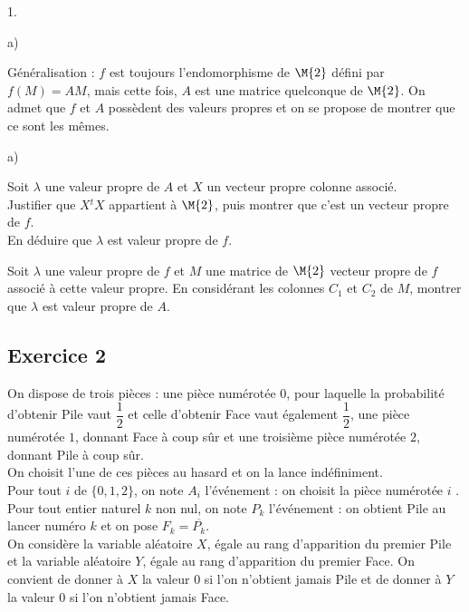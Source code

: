 \documentclass[11pt]{article}%
\begin{document}
\begin{noliste}{1.}
\begin{noliste}{a)}
    
  \end{noliste}




\item Généralisation : $f$ est toujours l'endomorphisme de $\M{2}$
  défini par $f(M) = AM$, mais cette fois, $A$ est une matrice
  quelconque de $\M{2}$. On admet que $f$ et $A$ possèdent des valeurs
  propres et on se propose de montrer que ce sont les mêmes.
  \begin{noliste}{a)}
    \setlength{\itemsep}{2mm}
  \item Soit $\lambda$ une valeur propre de $A$ et $X$ un vecteur
    propre colonne associé.\\
    Justifier que $X {}^tX$ appartient à $\M{2}$, puis montrer que
    c'est un vecteur propre de $f$.\\
    En déduire que $\lambda$ est valeur propre de $f$.

    

  \item Soit $\lambda$ une valeur propre de $f$ et $M$ une matrice de
    $\M{2}$ vecteur propre de $f$ associé à cette valeur propre. En
    considérant les colonnes $C_1$ et $C_2$ de $M$, montrer que
    $\lambda$ est valeur propre de $A$.

    
  \end{noliste}
\end{noliste}




\subsection*{Exercice 2}

\noindent
On dispose de trois pièces : une pièce numérotée $0$, pour laquelle la
probabilité d'obtenir Pile vaut $\dfrac{1}{2}$ et celle d'obtenir Face
vaut également $\dfrac{1}{2}$, une pièce numérotée $1$, donnant Face à
coup sûr et une troisième pièce numérotée $2$, donnant Pile à coup
sûr.\\
On choisit l'une de ces pièces au hasard et on la lance
indéfiniment.\\
Pour tout $i$ de $\{0, 1, 2\}$, on note $A_i$ l'événement : \og on
choisit la pièce numérotée $i$ \fg{}.\\
Pour tout entier naturel $k$ non nul, on note $P_k$ l'événement : \og
on obtient Pile au lancer numéro $k$ \fg{} et on pose $F_k =
\overline{P_k}$.\\
On considère la variable aléatoire $X$, égale au rang d'apparition du
premier Pile et la variable aléatoire $Y$, égale au rang d'apparition
du premier Face. On convient de donner à $X$ la valeur $0$ si l'on
n'obtient jamais Pile et de donner à $Y$ la valeur $0$ si l'on
n'obtient jamais Face.
\end{document}
